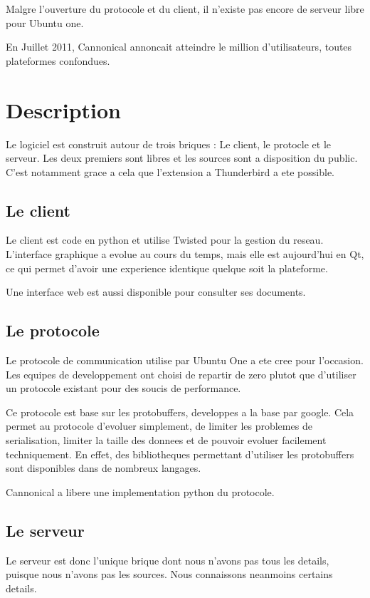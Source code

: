 Malgre l'ouverture du protocole et du client, il n'existe pas encore de serveur libre pour Ubuntu one.

En Juillet 2011, Cannonical annoncait atteindre le million d'utilisateurs, toutes plateformes confondues.

\section{Description}
Le logiciel est construit autour de trois briques : Le client, le protocle et le serveur. Les deux premiers sont libres et les sources sont a disposition du public. C'est notamment grace a cela que l'extension a Thunderbird a ete possible.

\subsection{Le client}
Le client est code en python et utilise Twisted pour la gestion du reseau. L'interface graphique a evolue au cours du temps, mais elle est aujourd'hui en Qt, ce qui permet d'avoir une experience identique quelque soit la plateforme.

Une interface web est aussi disponible pour consulter ses documents.

\subsection{Le protocole}

Le protocole de communication utilise par Ubuntu One a ete cree pour l'occasion. Les equipes de developpement ont choisi de repartir de zero plutot que d'utiliser un protocole existant pour des soucis de performance.

Ce protocole est base sur les protobuffers, developpes a la base par google. Cela permet au protocole d'evoluer simplement, de limiter les problemes de serialisation, limiter la taille des donnees et de pouvoir evoluer facilement techniquement. En effet, des bibliotheques permettant d'utiliser les protobuffers sont disponibles dans de nombreux langages.

Cannonical a libere une implementation python du protocole.

\subsection{Le serveur}

Le serveur est donc l'unique brique dont nous n'avons pas tous les details, puisque nous n'avons pas les sources. Nous connaissons neanmoins certains details.

